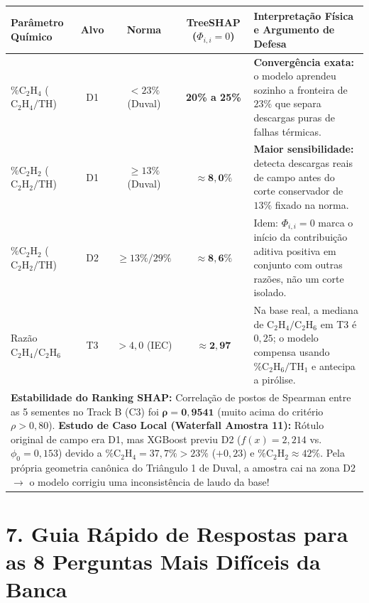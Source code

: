 \documentclass[10pt,a4paper]{article}
\begin{document}
\begin{table}[H]
\centering\footnotesize
\renewcommand{\arraystretch}{1.15}
\begin{tabularx}{\textwidth}{p{3.6cm} c c c X}
\toprule
\textbf{Parâmetro Químico} & \textbf{Alvo} & \textbf{Norma} & \textbf{TreeSHAP ($\Phi_{i,i}=0$)} & \textbf{Interpretação Física e Argumento de Defesa} \\
\midrule
$\% \text{C}_2\text{H}_4$ ($\text{C}_2\text{H}_4/\text{TH}$) & D1 & $< 23\%$ (Duval) & \textbf{20\% a 25\%} & \textbf{Convergência exata:} o modelo aprendeu sozinho a fronteira de $23\%$ que separa descargas puras de falhas térmicas. \\
$\% \text{C}_2\text{H}_2$ ($\text{C}_2\text{H}_2/\text{TH}$) & D1 & $\ge 13\%$ (Duval) & $\mathbf{\approx 8{,}0\%}$ & \textbf{Maior sensibilidade:} detecta descargas reais de campo antes do corte conservador de $13\%$ fixado na norma. \\
$\% \text{C}_2\text{H}_2$ ($\text{C}_2\text{H}_2/\text{TH}$) & D2 & $\ge 13\% / 29\%$ & $\mathbf{\approx 8{,}6\%}$ & Idem: $\Phi_{i,i}=0$ marca o início da contribuição aditiva positiva em conjunto com outras razões, não um corte isolado. \\
Razão $\text{C}_2\text{H}_4/\text{C}_2\text{H}_6$ & T3 & $> 4{,}0$ (IEC) & $\mathbf{\approx 2{,}97}$ & Na base real, a mediana de $\text{C}_2\text{H}_4/\text{C}_2\text{H}_6$ em T3 é $0{,}25$; o modelo compensa usando $\% \text{C}_2\text{H}_6/\text{TH}_1$ e antecipa a pirólise. \\
\bottomrule
\multicolumn{5}{p{0.97\textwidth}}{\scriptsize \textbf{Estabilidade do Ranking SHAP:} Correlação de postos de Spearman entre as 5 sementes no Track B (C3) foi $\mathbf{\rho = 0{,}9541}$ (muito acima do critério $\rho > 0{,}80$). \textbf{Estudo de Caso Local (Waterfall Amostra 11):} Rótulo original de campo era D1, mas XGBoost previu D2 ($f(x) = 2{,}214$ vs. $\phi_0 = 0{,}153$) devido a $\% \text{C}_2\text{H}_4 = 37{,}7\% > 23\%$ ($+0{,}23$) e $\% \text{C}_2\text{H}_2 \approx 42\%$. Pela própria geometria canônica do Triângulo 1 de Duval, a amostra cai na zona D2 $\to$ o modelo corrigiu uma inconsistência de laudo da base!}
\end{tabularx}
\end{table}

\section*{7. Guia Rápido de Respostas para as 8 Perguntas Mais Difíceis da Banca}
\end{document}
